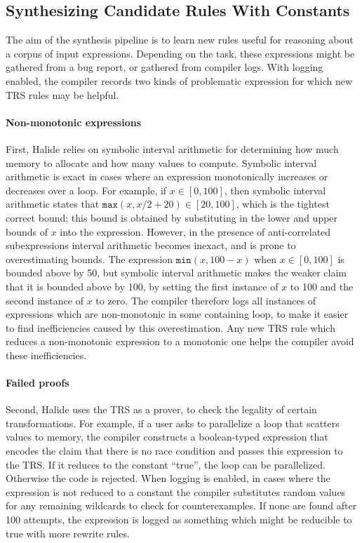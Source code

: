\documentclass[acmsmall,review,anonymous]{acmart}\settopmatter{printfolios=true,printccs=false,printacmref=false}
\newcommand{\hmax}[0]{\texttt{max}}
\newcommand{\hmin}[0]{\texttt{min}}
\begin{document}
\subsection{Synthesizing Candidate Rules With Constants}
\label{sec:synthesizing-candidate-rules}

The aim of the synthesis pipeline is to learn new rules useful for
reasoning about a corpus of input expressions. Depending on the task,
these expressions might be gathered from a bug report, or gathered
from compiler logs. With logging enabled, the compiler records two
kinds of problematic expression for which new TRS rules may be helpful.

\paragraph{Non-monotonic expressions}
First, Halide relies on symbolic interval arithmetic for determining
how much memory to allocate and how many values to compute. Symbolic
interval arithmetic is exact in cases where an expression
monotonically increases or decreases over a loop. For example, if $x
\in [0, 100]$, then symbolic interval arithmetic states that $\hmax(x,
x/2 + 20) \in [20, 100]$, which is the tightest correct
bound; this bound is obtained by substituting in the lower and upper bounds of $x$
into the expression. However, in the presence of anti-correlated subexpressions
interval arithmetic becomes inexact, and is prone to overestimating
bounds. The expression $\hmin(x, 100 - x)$ when $x \in [0, 100]$ is bounded above by 50, but
symbolic interval arithmetic makes the weaker claim that it is bounded
above by 100, by setting the first instance of $x$ to 100 and the
second instance of $x$ to zero. The compiler therefore logs all
instances of expressions which are non-monotonic in some containing
loop, to make it easier to find inefficiencies caused by this
overestimation. Any new TRS rule which reduces a non-monotonic
expression to a monotonic one helps the compiler avoid these
inefficiencies.

\paragraph{Failed proofs}
Second, Halide uses the TRS as a prover, to check the legality of
certain transformations. For example, if a user asks to parallelize a
loop that scatters values to memory, the compiler constructs a
boolean-typed expression that encodes the claim that there is no race
condition and passes this expression to the TRS. If it reduces to the
constant ``true'', the loop can be parallelized. Otherwise the code is
rejected. When logging is enabled, in cases where the expression is
not reduced to a constant the compiler substitutes random values for
any remaining wildcards to check for counterexamples. If none are
found after 100 attempts, the expression is logged as something which
might be reducible to true with more rewrite rules.
\end{document}
